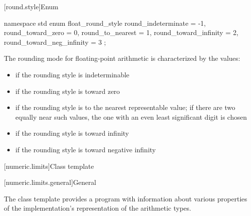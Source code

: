 [round.style]{Enum }

%
\begin{codeblock}
namespace std {
  enum float_round_style {
    round_indeterminate       = -1,
    round_toward_zero         =  0,
    round_to_nearest          =  1,
    round_toward_infinity     =  2,
    round_toward_neg_infinity =  3
  };
}
\end{codeblock}

\pnum
The rounding mode for floating-point arithmetic is characterized by the
values:
\begin{itemize}
\item
{}%
if the rounding style is indeterminable
\item
{}%
if the rounding style is toward zero
\item
{}%
if the rounding style is to the nearest representable value;
if there are two equally near such values,
the one with an even least significant digit is chosen
\item
{}%
if the rounding style is toward infinity
\item
{}%
if the rounding style is toward negative infinity
\end{itemize}

[numeric.limits]{Class template }

[numeric.limits.general]{General}

\pnum
The
%
class template provides a \Cpp{} program with information about various properties of
the implementation's representation of the
arithmetic types.

